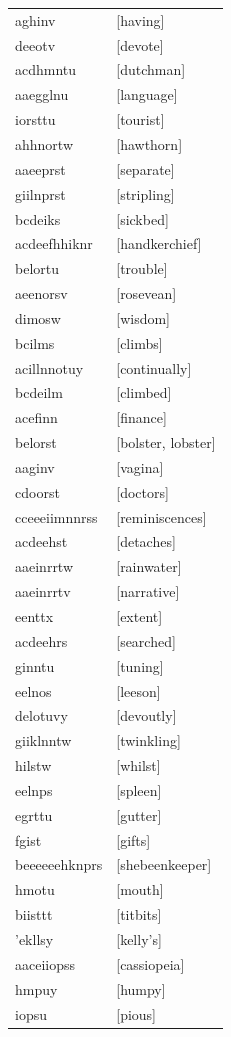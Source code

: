 \documentclass{article}
\begin{document}
\begin{tabular}{ll}
aghinv & [having] \\
deeotv & [devote] \\
acdhmntu & [dutchman] \\
aaegglnu & [language] \\
iorsttu & [tourist] \\
ahhnortw & [hawthorn] \\
aaeeprst & [separate] \\
giilnprst & [stripling] \\
bcdeiks & [sickbed] \\
acdeefhhiknr & [handkerchief] \\
belortu & [trouble] \\
aeenorsv & [rosevean] \\
dimosw & [wisdom] \\
bcilms & [climbs] \\
acillnnotuy & [continually] \\
bcdeilm & [climbed] \\
acefinn & [finance] \\
belorst & [bolster, lobster] \\
aaginv & [vagina] \\
cdoorst & [doctors] \\
cceeeiimnnrss & [reminiscences] \\
acdeehst & [detaches] \\
aaeinrrtw & [rainwater] \\
aaeinrrtv & [narrative] \\
eenttx & [extent] \\
acdeehrs & [searched] \\
ginntu & [tuning] \\
eelnos & [leeson] \\
delotuvy & [devoutly] \\
giiklnntw & [twinkling] \\
hilstw & [whilst] \\
eelnps & [spleen] \\
egrttu & [gutter] \\
fgist & [gifts] \\
beeeeeehknprs & [shebeenkeeper] \\
hmotu & [mouth] \\
biisttt & [titbits] \\
'ekllsy & [kelly's] \\
aaceiiopss & [cassiopeia] \\
hmpuy & [humpy] \\
iopsu & [pious] \\

\end{tabular}
\end{document}
